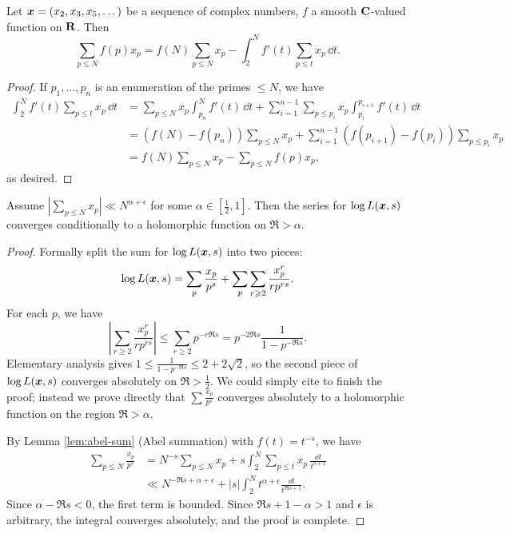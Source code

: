\begin{lemma}\label{lem:abel-sum}
Let ${\boldsymbol x}=(x_2,x_3,x_5,\dots)$ be a sequence of complex numbers, $f$ a smooth 
$\mathbf{C}$-valued function on $\mathbf{R}$. Then 
\[
	\sum_{p\leqslant N} f(p) x_p = f(N) \sum_{p\leqslant N} x_p - \int_2^N f'(t) \sum_{p\leqslant t} x_p\, \dd t .
\]
\end{lemma}
\begin{proof}
If $p_1,\dots,p_n$ is an enumeration of the primes $\leqslant N$, we have 
\begin{align*}
	\int_2^N f'(t) \sum_{p\leqslant t} x_p\, \dd t 
		&= \sum_{p\leqslant N} x_p \int_{p_n}^N f'(t)\, \dd t + \sum_{i=1}^{n-1} \sum_{p\leqslant p_i} x_p \int_{p_i}^{p_{i+1}} f'(t)\, \dd t \\
		&= \left(f(N) - f(p_n)\right) \sum_{p\leqslant N} x_p + \sum_{i=1}^{n-1} \left(f(p_{i+1}) - f(p_i)\right) \sum_{p\leqslant p_i} x_p \\
		&= f(N) \sum_{p\leqslant N} x_p - \sum_{p\leqslant N} f(p) x_p ,
\end{align*}
as desired. 
\end{proof}

\begin{theorem}\label{thm:AT->RH}
Assume $|\sum_{p\leqslant N} x_p| \ll N^{\alpha+\epsilon}$ for some 
$\alpha\in [\frac 1 2,1]$. Then the series for $\log L({\boldsymbol x},s)$ converges 
conditionally to a holomorphic function on $\Re > \alpha$. 
\end{theorem}
\begin{proof}
Formally split the sum for $\log L({\boldsymbol x},s)$ into two pieces: 
\[
	\log L({\boldsymbol x},s) = \sum_p \frac{x_p}{p^s} + \sum_p \sum_{r\geqslant 2} \frac{x_p^r}{r p^{r s}} .
\]
For each $p$, we have 
\[
	\left| \sum_{r\geqslant 2} \frac{x_p^r}{r p^{r s}}\right| \leqslant \sum_{r\geqslant 2} p^{- r \Re s} = p^{-2 \Re s} \frac{1}{1-p^{-\Re s}} .
\]
Elementary analysis gives 
$1 \leqslant \frac{1}{1-p^{-\Re s}} \leqslant 2 + 2\sqrt 2$, so the second 
piece of $\log L({\boldsymbol x},s)$ converges absolutely on $\Re >\frac 1 2$. We could 
simply cite \cite[II.1 Th.~10]{tenenbaum-1995} to finish the proof; instead we 
prove directly that $\sum \frac{x_p}{p^s}$ converges absolutely to a 
holomorphic function on the region $\Re > \alpha$. 

By Lemma \ref{lem:abel-sum} (Abel summation) with $f(t) = t^{-s}$, we have 
\begin{align*}
	\sum_{p\leqslant N} \frac{x_p}{p^s}
		&= N^{-s} \sum_{p\leqslant N} x_p + s \int_2^N \sum_{p\leqslant t} x_p\, \frac{\dd t}{t^{s+1}} \\
		&\ll N^{-\Re s + \alpha + \epsilon} + |s| \int_2^N t^{\alpha+\epsilon} \frac{\dd t}{t^{\Re s+1}} .
\end{align*}
Since $\alpha-\Re s < 0$, the first term is bounded. Since 
$\Re s+1-\alpha > 1$ and 
$\epsilon$ is arbitrary, the integral converges absolutely, and the proof is 
complete. 
\end{proof}

